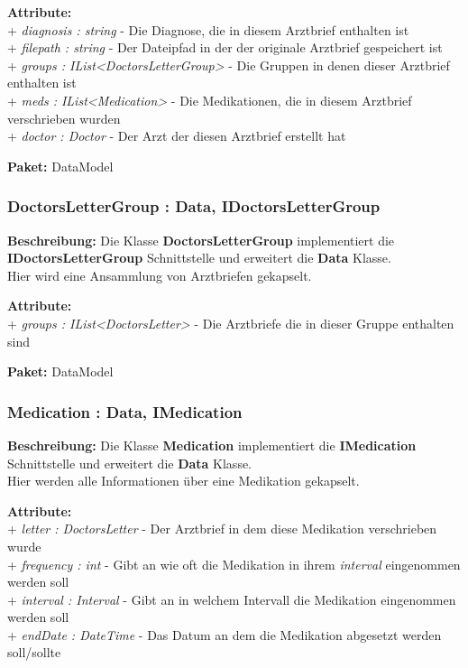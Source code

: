 \documentclass[a4paper]{scrreprt}
\begin{document}
\textbf{Attribute:}\\ 
+ \textit{diagnosis : string} - Die Diagnose, die in diesem Arztbrief enthalten ist\\
+ \textit{filepath : string} - Der Dateipfad in der der originale Arztbrief gespeichert ist\\
+ \textit{groups : IList<DoctorsLetterGroup>} - Die Gruppen in denen dieser Arztbrief enthalten ist\\
+ \textit{meds : IList<Medication>} - Die Medikationen, die in diesem Arztbrief verschrieben wurden\\
+ \textit{doctor : Doctor} - Der Arzt der diesen Arztbrief erstellt hat

\textbf{Paket:} DataModel

\subsubsection{DoctorsLetterGroup : Data, IDoctorsLetterGroup}
\textbf{Beschreibung:} Die Klasse \textbf{DoctorsLetterGroup} implementiert die \textbf{IDoctorsLetterGroup} Schnittstelle und erweitert die \textbf{Data} Klasse.\\
Hier wird eine Ansammlung von Arztbriefen gekapselt.

\textbf{Attribute:}\\
+ \textit{groups : IList<DoctorsLetter>} - Die Arztbriefe die in dieser Gruppe enthalten sind

\textbf{Paket:} DataModel

\subsubsection{Medication : Data, IMedication}
\textbf{Beschreibung:} Die Klasse \textbf{Medication} implementiert die \textbf{IMedication} Schnittstelle und erweitert die \textbf{Data} Klasse.\\
Hier werden alle Informationen über eine Medikation gekapselt.

\textbf{Attribute:}\\
+ \textit{letter : DoctorsLetter} - Der Arztbrief in dem diese Medikation verschrieben wurde\\
+ \textit{frequency : int} - Gibt an wie oft die Medikation in ihrem \textit{interval} eingenommen werden soll\\
+ \textit{interval : Interval} - Gibt an in welchem Intervall die Medikation eingenommen werden soll\\
+ \textit{endDate : DateTime} - Das Datum an dem die Medikation abgesetzt werden soll/sollte
\end{document}
